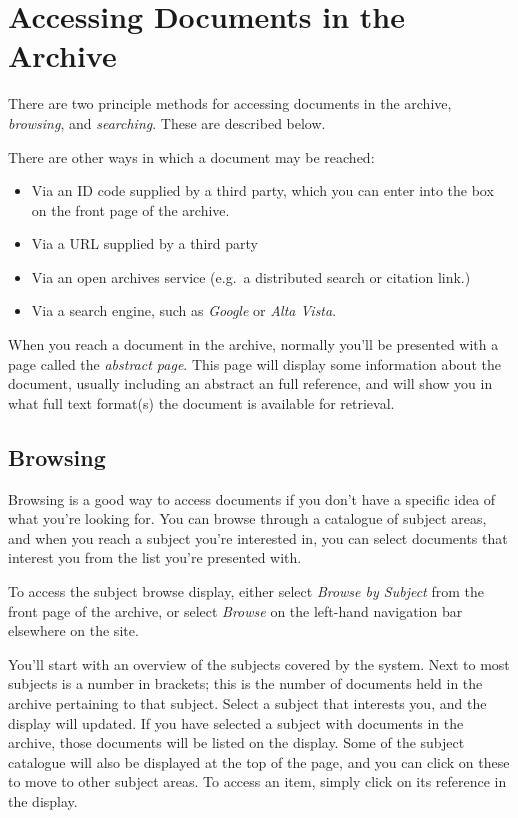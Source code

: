 
\section{Accessing Documents in the Archive}

There are two principle methods for accessing documents in the archive, \emph{browsing}, and \emph{searching}. These are described below.

There are other ways in which a document may be reached:

\begin{itemize}
\item Via an ID code supplied by a third party, which you can enter into the box on the front page of the archive.
\item Via a URL supplied by a third party
\item Via an open archives service (e.g.\ a distributed search or citation link.)
\item Via a search engine, such as \emph{Google} or \emph{Alta Vista}.
\end{itemize}

When you reach a document in the archive, normally you'll be presented with a page called the \emph{abstract page}. This page will display some information about the document, usually including an abstract an full reference, and will show you in what full text format(s) the document is available for retrieval.


\subsection{Browsing}

Browsing is a good way to access documents if you don't have a specific idea of what you're looking for. You can browse through a catalogue of subject areas, and when you reach a subject you're interested in, you can select documents that interest you from the list you're presented with.

To access the subject browse display, either select \emph{Browse by Subject} from the front page of the archive, or select \emph{Browse} on the left-hand navigation bar elsewhere on the site.

You'll start with an overview of the subjects covered by the system. Next to most subjects is a number in brackets; this is the number of documents held in the archive pertaining to that subject. Select a subject that interests you, and the display will updated. If you have selected a subject with documents in the archive, those documents will be listed on the display. Some of the subject catalogue will also be displayed at the top of the page, and you can click on these to move to other subject areas. To access an item, simply click on its reference in the display.

